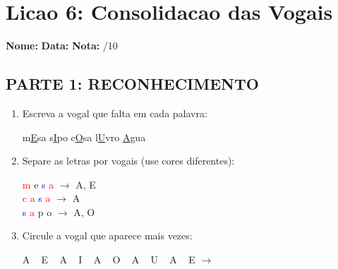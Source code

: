 \section{Licao 6: Consolidacao das Vogais}

\rotinasimples
{}



\begin{exercicio}
\noindent\textbf{Nome:} \underline{\hspace{3.2cm}} \quad \textbf{Data:} \underline{\hspace{1.6cm}} \quad \textbf{Nota:} \underline{\hspace{0.9cm}}/10

\subsection*{PARTE 1: RECONHECIMENTO}

\begin{enumerate}
  \item Escreva a vogal que falta em cada palavra:
  \begin{center}
  m\underline{E}sa \quad s\underline{I}po \quad c\underline{O}sa \quad l\underline{U}vro \quad \underline{A}gua
  \end{center}

  \item Separe as letras por vogais (use cores diferentes):
  \begin{center}
  \textcolor{red}{m} \textcolor{green!70!black}{e} \textcolor{blue}{s} \textcolor{red}{a} $\rightarrow$ A, E\\[0.5em]
  \textcolor{red}{c} \textcolor{red}{a} \textcolor{blue}{s} \textcolor{red}{a} $\rightarrow$ A\\[0.5em]
  \textcolor{blue}{s} \textcolor{red}{a} \textcolor{yellow!80!black}{p} \textcolor{yellow!80!black}{o} $\rightarrow$ A, O
  \end{center}

  \item Circule a vogal que aparece mais vezes:
  \begin{center}
  A  ~  E  ~  A  ~  I  ~  A  ~  O  ~  A  ~  U  ~  A  ~  E $\rightarrow$ 
  \end{center}


\end{enumerate}
\end{exercicio}
